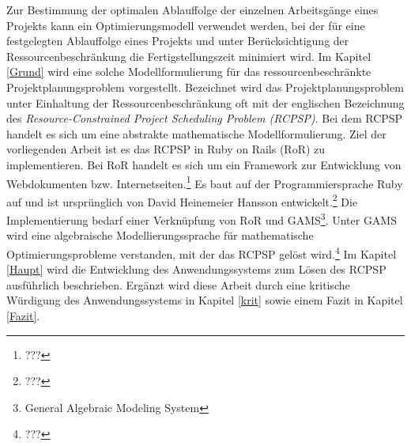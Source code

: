 \documentclass[a4paper,12pt,parskip,bibtotoc,liststotoc]{article}
\begin{document}
Zur Bestimmung der optimalen Ablauffolge der einzelnen Arbeitsgänge eines Projekts kann ein Optimierungsmodell verwendet werden, bei der für eine festgelegten Ablauffolge eines Projekts und unter Berücksichtigung der Ressourcenbeschränkung die Fertigstellungszeit minimiert wird. Im Kapitel \ref{Grund} wird eine solche Modellformulierung für das ressourcenbeschränkte Projektplanungsproblem vorgestellt. Bezeichnet wird das Projektplanungsproblem unter Einhaltung der Ressourcenbeschränkung oft mit der englischen Bezeichnung des \textit{Resource-Constrained Project Scheduling Problem (RCPSP)}. Bei dem RCPSP handelt es sich um eine abstrakte mathematische Modellformulierung. Ziel der vorliegenden Arbeit ist es das RCPSP in Ruby on Rails (RoR) zu implementieren. Bei RoR handelt es sich um ein Framework zur Entwicklung von Webdokumenten bzw. Internetseiten.\footnote{???} Es baut auf der Programmiersprache Ruby auf und ist ursprünglich von David Heinemeier Hansson entwickelt.\footnote{???} Die Implementierung bedarf einer Verknüpfung von RoR und GAMS\footnote{General Algebraic Modeling System}. Unter GAMS wird eine algebraische Modellierungssprache für mathematische Optimierungsprobleme verstanden, mit der das RCPSP gelöst wird.\footnote{???} Im Kapitel \ref{Haupt} wird die Entwicklung des Anwendungssystems zum Lösen des RCPSP ausführlich beschrieben. Ergänzt wird diese Arbeit durch eine kritische Würdigung des Anwendungssystems in Kapitel \ref{krit} sowie einem Fazit in Kapitel \ref{Fazit}.
\end{document}
